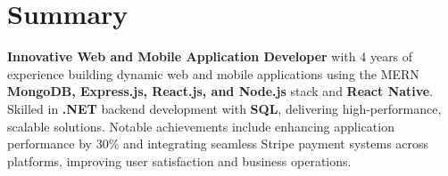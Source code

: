 
\section*{Summary}
\textbf{Innovative Web and Mobile Application Developer} with 4 years of experience building dynamic web and mobile applications using the MERN \textbf{MongoDB, Express.js, React.js, and Node.js} stack and \textbf{React Native}. Skilled in \textbf{.NET} backend development with \textbf{SQL}, delivering high-performance, scalable solutions. Notable achievements include enhancing application performance by 30\% and integrating seamless Stripe payment systems across platforms, improving user satisfaction and business operations.
